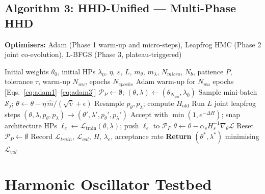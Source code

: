 \documentclass[11pt]{article}
\theoremstyle{definition}
\newcommand{\calB}{\mathcal{P}}
\begin{document}
\subsection{Algorithm 3: HHD-Unified --- Multi-Phase HHD}
\begin{algorithm}[H]
\caption{HHD-Unified --- Unified HHD-ABBO}
\label{alg:unified}
\textbf{Optimisers:} Adam (Phase 1 warm-up and micro-steps),
Leapfrog HMC (Phase 2 joint co-evolution),
L-BFGS (Phase 3, plateau-triggered)
\begin{algorithmic}[1]
\Require Initial weights $\theta_0$, initial HPs $\lambda_0$,
         $\eta$, $\varepsilon$, $L$, $m_\theta$, $m_\lambda$,
         $N_{micro}$, $N_b$, patience $P$, tolerance $\tau$,
         warm-up $N_{wu}$, epochs $N_{epochs}$
\State Adam warm-up for $N_{wu}$ epochs [Eqs.~\eqref{eq:adam1}--\eqref{eq:adam3}]
\State $\calB_P \leftarrow \emptyset$;
       $(\theta, \lambda) \leftarrow (\theta_{N_{wu}}, \lambda_0)$
    \State Sample mini-batch $\mathcal{S}_j$;
      $\theta \leftarrow \theta
        - \eta\,\hat{m}/(\sqrt{\hat{v}}+\epsilon)$
  \EndFor
  \State Resample $p_\theta, p_\lambda$; compute $H_{\mathrm{old}}$
    \hfill{}
  \State Run $L$ joint leapfrog steps
    $(\theta,\lambda,p_\theta,p_\lambda)\to(\theta',\lambda',p_\theta',p_\lambda')$
  \State Accept with $\min(1,e^{-\Delta H})$; snap architecture HPs
  \State $\ell_e \leftarrow \mathcal{L}_{\mathrm{train}}(\theta,\lambda)$;
    push $\ell_e$ to $\calB_P$
  \If{$|\calB_P|\ge P$ \textbf{and}
      $(\ell_{e-P}-\ell_e)/\ell_{e-P} < \tau$}
      \State $\theta \leftarrow \theta
        - \alpha_s H_s^{-1}\nabla_\theta\mathcal{L}$
    \EndFor
    \State Reset $\calB_P \leftarrow \emptyset$
  \EndIf
  \State Record $\mathcal{L}_{train}$, $\mathcal{L}_{val}$,
    $H$, $\lambda_e$, acceptance rate
\EndFor
\State \textbf{Return} $(\theta^*, \lambda^*)$ minimising $\mathcal{L}_{val}$
\end{algorithmic}
\end{algorithm}


\section{Harmonic Oscillator Testbed}
\end{document}
